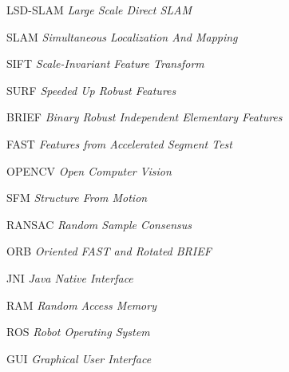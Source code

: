 
\begin{siglas}
\item[LSD-SLAM]\textit{Large Scale Direct SLAM} 
\item[SLAM]\textit{Simultaneous Localization And Mapping}
\item[SIFT]\textit{Scale-Invariant Feature Transform}
\item[SURF]\textit{Speeded Up Robust Features}
\item[BRIEF]\textit{Binary Robust Independent Elementary Features}
\item[FAST]\textit{Features from Accelerated Segment Test}
\item[OPENCV]\textit{Open Computer Vision}
\item[SFM]\textit{Structure From Motion}
\item[RANSAC]\textit{Random Sample Consensus}
\item[ORB]\textit{Oriented FAST and Rotated BRIEF}
\item[JNI]\textit{Java Native Interface}
\item[RAM]\textit{Random Access Memory}
\item[ROS]\textit{Robot Operating System}
\item[GUI]\textit{Graphical User Interface}

\end{siglas}
